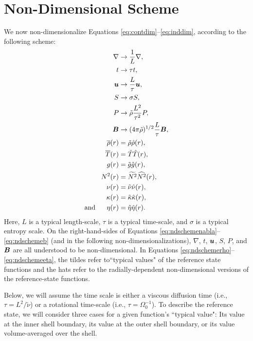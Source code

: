 \documentclass[12pt]{article}
\numberwithin{equation}{section}
\newcommand{\rhond}{\hat{\rho}}
\newcommand{\tmpnd}{\hat{T}}
\newcommand{\gnd}{\hat{g}}
\newcommand{\nund}{\hat{\nu}}
\newcommand{\kappand}{\hat{\kappa}}
\newcommand{\etand}{\hat{\eta}}
\begin{document}
	\section{Non-Dimensional Scheme}
	We now non-dimensionalize Equations \eqref{eq:contdim}--\eqref{eq:inddim}, according to the following scheme:
	\begin{subequations}\label{eq:ndscheme}
	\begin{align}
		\nabla &\rightarrow \frac{1}{L}\nabla\label{eq:ndschemenabla},\\
		t &\rightarrow \tau t,\\
		\vecu &\rightarrow \frac{L}{\tau} \vecu,\\
		S &\rightarrow \sigma S,\\
		P &\rightarrow \tilde{\rho} \frac{L^2}{\tau^2} P,\\
		\vecb &\rightarrow (4\pi\tilde{\rho})^{1/2}\frac{L}{\tau} \vecb \label{eq:ndschemeb},\\ 
		\rhoref\ofr &= \tilde{\rho} \rhond\ofr  \label{eq:ndschemerho}, \\
		\tmpref\ofr &= \tilde{T} \tmpnd\ofr,\\
		g\ofr &= \tilde{g} \gnd\ofr,\\
		N^2\ofr &= \widetilde{N^2} \widehat{N^2}\ofr,\\
		\nu\ofr &= \tilde{\nu}\nund\ofr,\\
		\kappa\ofr &= \tilde{\kappa}\kappand\ofr,\\
		\andd \eta\ofr &= \tilde{\eta}\etand\ofr. \label{eq:ndschemeeta} 
	\end{align}
	\end{subequations}
	Here, $L$ is a typical length-scale, $\tau$ is a typical time-scale, and $\sigma$ is a typical entropy scale. On the right-hand-sides of Equations \eqref{eq:ndschemenabla}--\eqref{eq:ndschemeb} (and in the following non-dimensionalizations), $\nabla$, $t$, $\bm{u}$, $S$, $P$, and $\bm{B}$ are all understood to be non-dimensional. In Equations \eqref{eq:ndschemerho}--\eqref{eq:ndschemeeta}, the tildes refer to``typical values" of the reference state functions and the hats refer to the radially-dependent non-dimensional versions of the reference-state functions. 
	
	Below, we will assume the time scale is either a viscous diffusion time (i.e., $\tau=L^2/\tilde{\nu}$) or a rotational time-scale (i.e., $\tau=\Omega_0^{-1}$). To describe the reference state, we will consider three cases for a given function's ``typical value": Its value at the inner shell boundary, its value at the outer shell boundary, or its value volume-averaged over the shell. 
	
\end{document}
